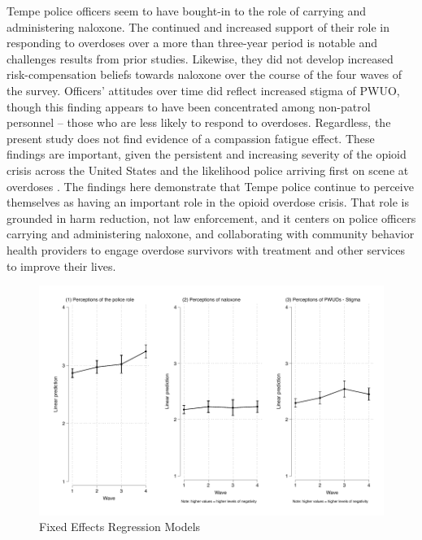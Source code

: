 Tempe police officers seem to have bought-in to the role of carrying and administering naloxone. The continued and increased support of their role in responding to overdoses over a more than three-year period is notable and challenges results from prior studies. Likewise, they did not develop increased risk-compensation beliefs towards naloxone over the course of the four waves of the survey.  Officers’ attitudes over time did reflect increased stigma of PWUO, though this finding appears to have been concentrated among non-patrol personnel – those who are less likely to respond to overdoses. Regardless, the present study does not find evidence of a compassion fatigue effect. These findings are important, given the persistent and increasing severity of the opioid crisis across the United States and the likelihood police arriving first on scene at overdoses \parencite{white_leveraging_2022}. The findings here demonstrate  that Tempe police continue to perceive themselves as having an important role in the opioid overdose crisis. That role is grounded in harm reduction, not law enforcement, and it centers on police officers carrying and administering naloxone, and collaborating with community behavior health providers to engage overdose survivors with treatment and other services to improve their lives.  


\pagebreak



\newpage


\newpage
\begin{figure}
    \centering
    \caption{\centering Fixed Effects Regression Models}
    \includegraphics{figures/growth_models.pdf}
\end{figure}


